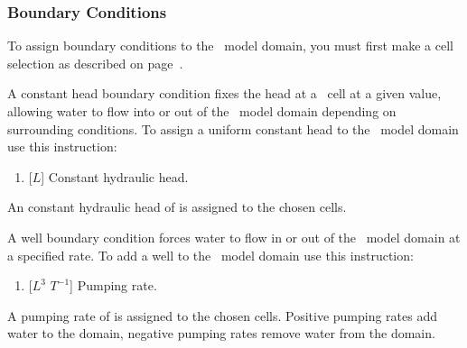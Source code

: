 \subsubsection{Boundary Conditions}  
To assign boundary conditions  to the \cln\ model domain, you must first make a cell selection as described on page~\pageref{page:cellSelect}.

A constant head boundary condition fixes the head at a \cln\ cell at a given value, allowing water to flow into or out of the \cln\ model domain depending on surrounding conditions.    To assign a uniform constant head to the \cln\ model domain use this instruction:

    {
        \squish
        \begin{enumerate}
        \item {} [$L$]  Constant hydraulic head.
        \end{enumerate}
          An constant hydraulic head  of  is assigned to the chosen cells.
    }

A well boundary condition forces  water to flow in or out of the \cln\ model domain at a specified rate.   To add a well  to the \cln\ model domain use this instruction:

    {
        \squish
        \begin{enumerate}
            \item {} [$L^{3}$ $T^{-1}$]  Pumping rate.
        \end{enumerate}
        A pumping  rate of  is assigned to the chosen cells. Positive pumping rates add water to the domain, negative pumping rates remove water from the domain.
    }


